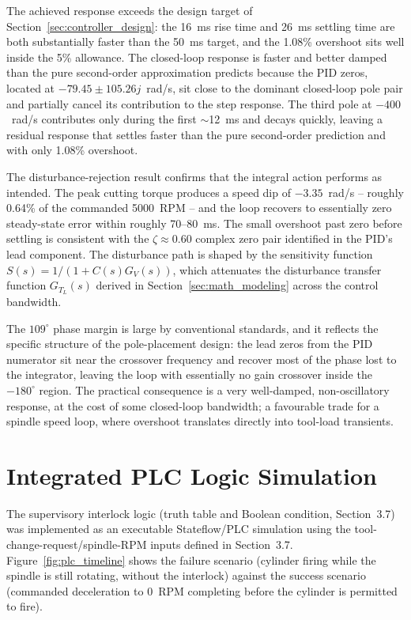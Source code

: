 \documentclass[12pt,a4paper]{report}
\begin{document}
The achieved response exceeds the design target of Section~\ref{sec:controller_design}: the
16~ms rise time and 26~ms settling time are both substantially faster than the 50~ms target,
and the 1.08\% overshoot sits well inside the 5\% allowance. The closed-loop response is
faster and better damped than the pure second-order approximation predicts because the PID
zeros, located at $-79.45 \pm 105.26j$~rad/s, sit close to the dominant closed-loop pole
pair and partially cancel its contribution to the step response. The third pole at
$-400$~rad/s contributes only during the first $\sim$12~ms and decays quickly, leaving a
residual response that settles faster than the pure second-order prediction and with only
1.08\% overshoot.

The disturbance-rejection result confirms that the integral action performs as intended. The
peak cutting torque produces a speed dip of $-3.35$~rad/s -- roughly 0.64\% of the commanded
5000~RPM -- and the loop recovers to essentially zero steady-state error within roughly
70--80~ms. The small overshoot past zero before settling is consistent with the
$\zeta \approx 0.60$ complex zero pair identified in the PID's lead component. The
disturbance path is shaped by the sensitivity function $S(s) = 1/(1 + C(s)G_V(s))$, which
attenuates the disturbance transfer function $G_{T_L}(s)$ derived in
Section~\ref{sec:math_modeling} across the control bandwidth.

The $109^\circ$ phase margin is large by conventional standards, and it reflects the specific
structure of the pole-placement design: the lead zeros from the PID numerator sit near the
crossover frequency and recover most of the phase lost to the integrator, leaving the loop
with essentially no gain crossover inside the $-180^\circ$ region. The practical consequence
is a very well-damped, non-oscillatory response, at the cost of some closed-loop bandwidth; a favourable trade for a spindle speed loop, where overshoot translates directly into
tool-load transients.
	
	\section{Integrated PLC Logic Simulation}
	The supervisory interlock logic (truth table and Boolean condition, Section~3.7) was
	implemented as an executable Stateflow/PLC simulation using the
	tool-change-request/spindle-RPM inputs defined in Section~3.7. Figure~\ref{fig:plc_timeline}
	shows the failure scenario (cylinder firing while the spindle is still rotating, without the
	interlock) against the success scenario (commanded deceleration to 0~RPM completing before
	the cylinder is permitted to fire).
	
\end{document}
